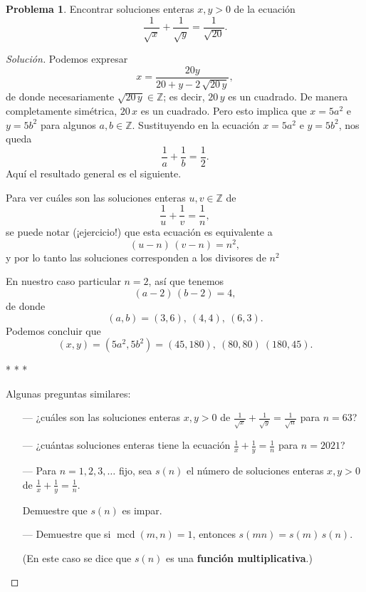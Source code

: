 \documentclass{article}
\newcommand{\ZZ}{\mathbb{Z}}
\DeclareMathOperator{\mcd}{mcd}
\theoremstyle{definition}
\newtheorem{problema}{Problema}
\newenvironment{solucion}{\begin{proof}[Solución]}{\end{proof}}
\begin{document}
\begin{problema}
  Encontrar soluciones enteras $x, y > 0$ de la ecuación
  $$\frac{1}{\sqrt{x}} + \frac{1}{\sqrt{y}} = \frac{1}{\sqrt{20}}.$$

  \ifdefined\solutions\begin{solucion}    
    Podemos expresar
    $$x = \frac{20y}{20 + y - 2\,\sqrt{20\,y}},$$
    de donde necesariamente $\sqrt{20\,y} \in \ZZ$; es decir, $20\,y$ es un
    cuadrado. De manera completamente simétrica, $20\,x$ es un cuadrado. Pero
    esto implica que $x = 5a^2$ e $y = 5b^2$ para algunos $a,b \in \ZZ$.
    Sustituyendo en la ecuación $x = 5a^2$ e $y = 5b^2$, nos queda
    $$\frac{1}{a} + \frac{1}{b} = \frac{1}{2}.$$
    Aquí el resultado general es el siguiente.

    \begin{framed}
      Para ver cuáles son las soluciones enteras $u,v \in \ZZ$ de
      $$\frac{1}{u} + \frac{1}{v} = \frac{1}{n},$$
      se puede notar (¡ejercicio!) que esta ecuación es equivalente a
      $$(u - n)\,(v - n) = n^2,$$
      y por lo tanto las soluciones corresponden a los divisores de $n^2$
    \end{framed}

    En nuestro caso particular $n = 2$, así que tenemos
    $$(a - 2)\,(b - 2) = 4,$$
    de donde
    $$(a,b) = (3,6), ~ (4,4), ~ (6,3).$$
    Podemos concluir que
    $$(x,y) = (5a^2,5b^2) = (45, 180), ~ (80,80) ~ (180,45).$$

    \begin{center}
      * * *
    \end{center}

    Algunas preguntas similares:

    \begin{itemize}
    \item[---] ¿cuáles son las soluciones enteras $x,y > 0$ de
      $\frac{1}{\sqrt{x}} + \frac{1}{\sqrt{y}} = \frac{1}{\sqrt{n}}$ para
      $n = 63$?

    \item[---] ¿cuántas soluciones enteras tiene la ecuación
      $\frac{1}{x} + \frac{1}{y} = \frac{1}{n}$ para $n = 2021$?

    \item[---] Para $n = 1,2,3,\ldots$ fijo, sea $s(n)$ el número de soluciones
      enteras $x,y > 0$ de $\frac{1}{x} + \frac{1}{y} = \frac{1}{n}$.

      Demuestre que $s(n)$ es impar.

    \item[---] Demuestre que si $\mcd (m,n) = 1$, entonces $s(mn) = s(m)\,s(n)$.

      (En este caso se dice que $s (n)$ es una \textbf{función multiplicativa}.)
    \end{itemize}
  \end{solucion}\fi
\end{problema}
\end{document}
